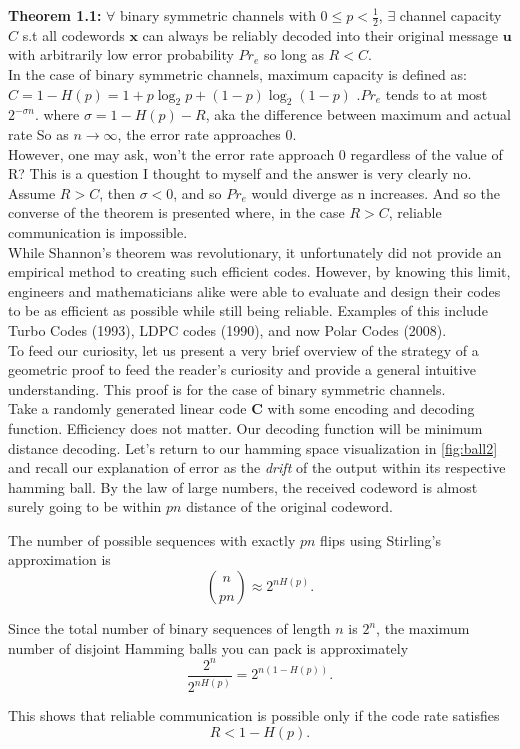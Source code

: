 \textbf{Theorem 1.1:} $\forall$ binary symmetric channels with $0 \le p < \frac{1}{2}$, $\exists$ channel capacity $C$ s.t all codewords ${\mathbf{x}}$ can always be reliably decoded into their original message $\mathbf{u}$ with arbitrarily low error probability $Pr_{e}$ so long as $R < C$.  \\

 In the case of binary symmetric channels, maximum capacity is defined as: $C = 1 - H(p) = 1 + p\log_{2}{p} + (1-p)\log_{2}{(1-p)}$ .$Pr_{e}$ tends to at most $2^{-\sigma n}$.  where $\sigma = 1-H(p) -R$, aka the difference between maximum and actual rate So as $n \to \infty$, the error rate approaches 0. \\

However, one may ask, won't the error rate approach 0 regardless of the value of R? This is a question I thought to myself and the answer is very clearly no. Assume $R > C$, then $\sigma < 0$, and so $Pr_{e}$ would diverge as n increases. And so the converse of the theorem is presented where, in the case $R>C$, reliable communication is impossible. 
\\
While Shannon's theorem was revolutionary, it unfortunately did not provide an empirical method to creating such efficient codes. However, by knowing this limit, engineers and mathematicians alike were able to evaluate and design their codes to be as efficient as possible while still being reliable. Examples of this include Turbo Codes (1993), LDPC codes (1990), and now Polar Codes (2008). \\

To feed our curiosity, let us present a very brief overview of the strategy of a geometric proof to feed the reader's curiosity and provide a general intuitive understanding. This proof is for the case of binary symmetric channels. \\


Take a randomly generated linear code \textbf{C} with some encoding and decoding function. Efficiency does not matter. Our decoding function will be minimum distance decoding. Let's return to our hamming space visualization in \ref{fig:ball2} and recall our explanation of error as the \textit{drift} of the output within its respective hamming ball. By the law of large numbers, the received codeword is almost surely going to be within $pn$ distance of the original codeword. 

The number of possible sequences with exactly $pn$ flips using Stirling's approximation is \[
\binom{n}{pn} \approx 2^{nH(p)}.
\] 

Since the total number of binary sequences of length \(n\) is \(2^n\), the maximum number of disjoint Hamming balls you can pack is approximately
\[
\frac{2^n}{2^{nH(p)}} = 2^{n(1-H(p))}.
\]

This shows that reliable communication is possible only if the code rate satisfies
\[
R < 1 - H(p).
\]
